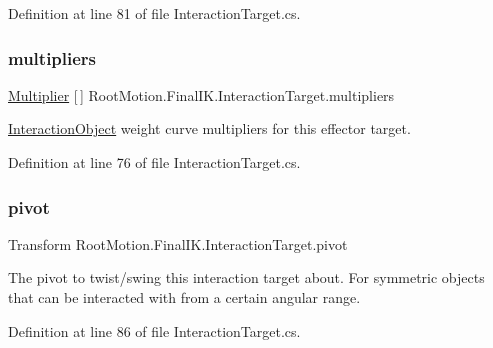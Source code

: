 Definition at line 81 of file Interaction\+Target.\+cs.

\mbox{\label{class_root_motion_1_1_final_i_k_1_1_interaction_target_ae8fd42003a4a2ee7f8dfd70aec0042c9}} 
\subsubsection{\texorpdfstring{multipliers}{multipliers}}
{\footnotesize\ttfamily \mbox{\hyperlink{class_root_motion_1_1_final_i_k_1_1_interaction_target_1_1_multiplier}{Multiplier}} \mbox{[}$\,$\mbox{]} Root\+Motion.\+Final\+I\+K.\+Interaction\+Target.\+multipliers}



\mbox{\hyperlink{class_root_motion_1_1_final_i_k_1_1_interaction_object}{Interaction\+Object}} weight curve multipliers for this effector target. 



Definition at line 76 of file Interaction\+Target.\+cs.

\mbox{\label{class_root_motion_1_1_final_i_k_1_1_interaction_target_a042a6f413a9ea2cb467dce6d8ed9739d}} 
\subsubsection{\texorpdfstring{pivot}{pivot}}
{\footnotesize\ttfamily Transform Root\+Motion.\+Final\+I\+K.\+Interaction\+Target.\+pivot}



The pivot to twist/swing this interaction target about. For symmetric objects that can be interacted with from a certain angular range. 



Definition at line 86 of file Interaction\+Target.\+cs.

